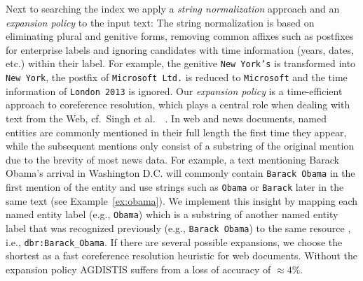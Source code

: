 Next to searching the index we apply a \emph{string normalization} approach and an \emph{expansion policy} to the input text:
The string normalization is based on eliminating plural and genitive forms, removing common affixes such as postfixes for enterprise labels and ignoring candidates with time information (years, dates, etc.) within their label.
For example, the genitive \texttt{New York's} is transformed into \texttt{New York}, the postfix of \texttt{Microsoft Ltd.} is reduced to \texttt{Microsoft} and the time information of \texttt{London 2013} is ignored.
Our \emph{expansion policy} is a time-efficient approach to coreference resolution, which plays a central role when dealing with text from the Web, cf.~Singh et al.~~\cite{singh}. 
In web and news documents, named entities are commonly mentioned in their full length the first time they appear, while the subsequent mentions only consist of a substring of the original mention due to the brevity of most news data.
For example, a text mentioning Barack Obama's arrival in Washington D.C. will commonly contain \texttt{Barack Obama} in the first mention of the entity and use strings such as \texttt{Obama} or \texttt{Barack} later in the same text (see Example~\ref{ex:obama}).
We implement this insight by mapping each named entity label (e.g., \texttt{Obama}) which is a substring of another named entity label that was recognized previously (e.g., \texttt{Barack Obama}) to the same resource ,\,i.e., \texttt{dbr:Barack\_Obama}.
If there are several possible expansions, we choose the shortest as a fast coreference resolution heuristic for web documents.
Without the expansion policy AGDISTIS suffers from a loss of accuracy of $\approx4\%$.




